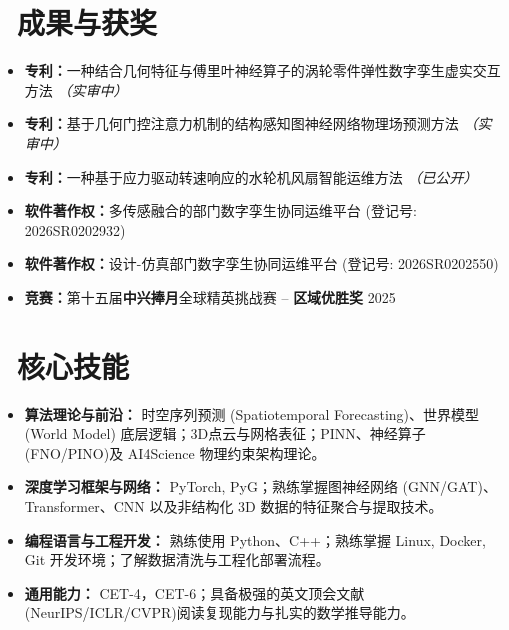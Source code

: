 \documentclass[11pt]{article}
\begin{document}
\section{%
    \makebox[\widthof{\faTrophy}][c]%
    {\color{CVBlue}\faTrophy}\ 成果与获奖%
}

\begin{itemize}
    \item \textbf{专利：}一种结合几何特征与傅里叶神经算子的涡轮零件弹性数字孪生虚实交互方法 \textit{（实审中）}
    \item \textbf{专利：}基于几何门控注意力机制的结构感知图神经网络物理场预测方法 \textit{（实审中）}
    \item \textbf{专利：}一种基于应力驱动转速响应的水轮机风扇智能运维方法 \textit{（已公开）}
    \item \textbf{软件著作权：}多传感融合的部门数字孪生协同运维平台 (登记号: 2026SR0202932)
    \item \textbf{软件著作权：}设计-仿真部门数字孪生协同运维平台 (登记号: 2026SR0202550)
    \item \textbf{竞赛：}第十五届\textbf{中兴捧月}全球精英挑战赛 -- \textbf{区域优胜奖} \hfill 2025
\end{itemize}

\section{\makebox[\widthof{\faCogs}][c]{\color{CVBlue}\faCogs}\ 核心技能}
    
\begin{itemize}
    \item \textbf{算法理论与前沿：} 时空序列预测 (Spatiotemporal Forecasting)、世界模型 (World Model) 底层逻辑；3D点云与网格表征；PINN、神经算子(FNO/PINO)及 AI4Science 物理约束架构理论。
    \item \textbf{深度学习框架与网络：} PyTorch, PyG；熟练掌握图神经网络 (GNN/GAT)、Transformer、CNN 以及非结构化 3D 数据的特征聚合与提取技术。
    \item \textbf{编程语言与工程开发：} 熟练使用 Python、C++；熟练掌握 Linux, Docker, Git 开发环境；了解数据清洗与工程化部署流程。
    \item \textbf{通用能力：} CET-4，CET-6；具备极强的英文顶会文献(NeurIPS/ICLR/CVPR)阅读复现能力与扎实的数学推导能力。
\end{itemize}
\end{document}
